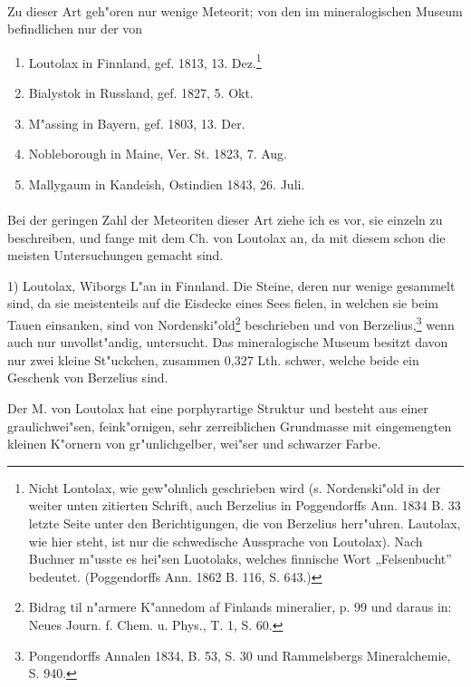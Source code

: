 \documentclass[a4paper, 11pt, oneside, german]{article}
\begin{document}
\paragraph{}
Zu dieser Art geh"oren nur wenige Meteorit; von den im mineralogischen Museum befindlichen nur der von
\begin{enumerate}
    \item Loutolax in Finnland, gef. 1813, 13. Dez.\footnote{Nicht Lontolax, wie gew"ohnlich geschrieben wird (s. Nordenski"old in der weiter unten zitierten Schrift, auch Berzelius in Poggendorffs Ann. 1834 B. 33 letzte Seite unter den Berichtigungen, die von Berzelius herr"uhren. Lautolax, wie hier steht, ist nur die schwedische Aussprache von Loutolax). Nach Buchner m"usste es hei"sen Luotolaks, welches finnische Wort „Felsenbucht” bedeutet. (Poggendorffs Ann. 1862 B. 116, S. 643.)}
    \item Bialystok in Russland, gef. 1827, 5. Okt.
    \item M"assing in Bayern, gef. 1803, 13. Der.
    \item Nobleborough in Maine, Ver. St. 1823, 7. Aug.
    \item Mallygaum in Kandeish, Ostindien 1843, 26. Juli.
\end{enumerate}
\paragraph{}
Bei der geringen Zahl der Meteoriten dieser Art ziehe ich es vor, sie einzeln zu beschreiben, und fange mit dem Ch. von Loutolax an, da mit diesem schon die meisten Untersuchungen gemacht sind.

1) Loutolax, Wiborgs L"an in Finnland. Die Steine, deren nur wenige gesammelt sind, da sie meistenteils auf die Eisdecke eines Sees fielen, in welchen sie beim Tauen einsanken, sind von Nordenski"old\footnote{Bidrag til n"armere K"annedom af Finlands mineralier, p. 99 und daraus in: Neues Journ. f. Chem. u. Phys., T. 1, S. 60.} beschrieben und von Berzelius,\footnote{Pongendorffs Annalen 1834, B. 53, S. 30 und Rammelsbergs Mineralchemie, S. 940.} wenn auch nur unvollst"andig, untersucht. Das mineralogische Museum besitzt davon nur zwei kleine St"uckchen, zusammen 0,327 Lth. schwer, welche beide ein Geschenk von Berzelius sind.

Der M. von Loutolax hat eine porphyrartige Struktur und besteht aus einer graulichwei"sen, feink"ornigen, sehr zerreiblichen Grundmasse mit eingemengten kleinen K"ornern von gr"unlichgelber, wei"ser und schwarzer Farbe.
\end{document}
